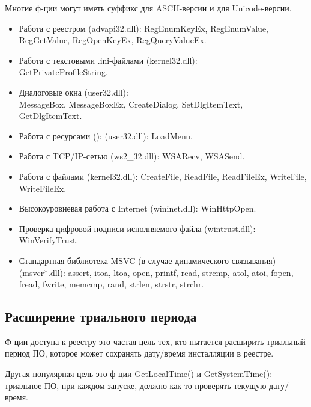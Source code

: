 Многие ф-ции могут иметь суффикс  для ASCII-версии и  для Unicode-версии.

\begin{itemize}

\item
Работа с реестром (advapi32.dll): 
RegEnumKeyEx, RegEnumValue, RegGetValue, RegOpenKeyEx, RegQueryValueEx.

\item
Работа с текстовыми .ini-файлами (kernel32.dll):\\
GetPrivateProfileString.

\item
Диалоговые окна (user32.dll):\\
MessageBox, MessageBoxEx, CreateDialog, SetDlgItemText, GetDlgItemText.

\item
Работа с ресурсами (): (user32.dll):
LoadMenu.

\item
Работа с TCP/IP-сетью (ws2\_32.dll):
WSARecv, WSASend.

\item
Работа с файлами (kernel32.dll):
CreateFile, ReadFile, ReadFileEx, WriteFile, WriteFileEx.

\item
Высокоуровневая работа с Internet
(wininet.dll):
WinHttpOpen.

\item
Проверка цифровой подписи исполняемого файла (wintrust.dll):
WinVerifyTrust.

\item
Стандартная библиотека MSVC (в случае динамического связывания)%
 (msvcr*.dll):
assert, itoa, ltoa, open, printf, read, strcmp, atol, atoi, fopen, fread, fwrite, memcmp, rand,
strlen, strstr, strchr.

\end{itemize}

\subsection{Расширение триального периода}

Ф-ции доступа к реестру это частая цель тех, кто пытается расширить триальный период ПО, которое
может сохранять дату/время инсталляции в реестре.

Другая популярная цель это ф-ции GetLocalTime() и GetSystemTime():
триальное ПО, при каждом запуске, должно как-то проверять текущую дату/время.

